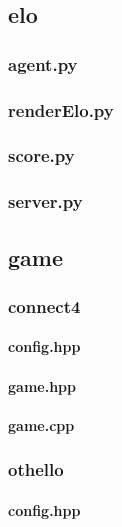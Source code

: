 \documentclass[12pt]{article}
\newcommand{\incFile}[2]{\label{code:#2}}
\begin{document}
\subsection{elo}																%
\subsubsection{agent.py}												\incFile{python}{elo/agent.py}
\subsubsection{renderElo.py}										\incFile{python}{elo/renderElo.py}
\subsubsection{score.py}												\incFile{python}{elo/score.py}
\subsubsection{server.py}												\incFile{python}{elo/server.py}

\subsection{game}															%
\subsubsection{connect4}
\paragraph{config.hpp}													\incFile{C++}{games/connect4/config.hpp}
\paragraph{game.hpp}													\incFile{C++}{games/connect4/game.hpp}
\paragraph{game.cpp}													\incFile{C++}{games/connect4/game.cpp}
\subsubsection{othello}													%
\paragraph{config.hpp}													\incFile{C++}{games/othello/config.hpp}
\end{document}
